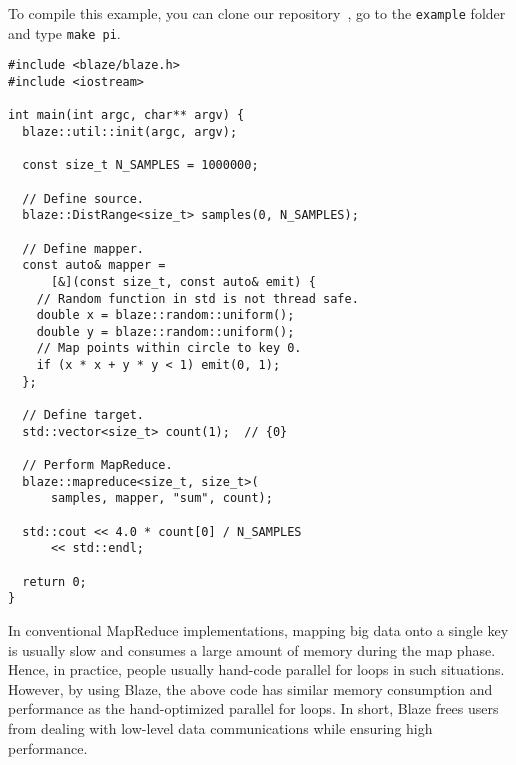 To compile this example, you can clone our repository~\cite{blaze}, go to the \lstinline{example} folder and type \lstinline{make pi}.

\begin{lstlisting}
#include <blaze/blaze.h>
#include <iostream>

int main(int argc, char** argv) {
  blaze::util::init(argc, argv);
  
  const size_t N_SAMPLES = 1000000;

  // Define source.
  blaze::DistRange<size_t> samples(0, N_SAMPLES);

  // Define mapper.
  const auto& mapper = 
      [&](const size_t, const auto& emit) {
    // Random function in std is not thread safe.
    double x = blaze::random::uniform();
    double y = blaze::random::uniform();
    // Map points within circle to key 0.
    if (x * x + y * y < 1) emit(0, 1);
  };

  // Define target.
  std::vector<size_t> count(1);  // {0}

  // Perform MapReduce.
  blaze::mapreduce<size_t, size_t>(
      samples, mapper, "sum", count);

  std::cout << 4.0 * count[0] / N_SAMPLES
      << std::endl;
  
  return 0;
}
\end{lstlisting}


In conventional MapReduce implementations, mapping big data onto a single key is usually slow and consumes a large amount of memory during the map phase.
Hence, in practice, people usually hand-code parallel for loops in such situations.
However, by using Blaze, the above code has similar memory consumption and performance as the hand-optimized parallel for loops.
In short, Blaze frees users from dealing with low-level data communications while ensuring high performance.
